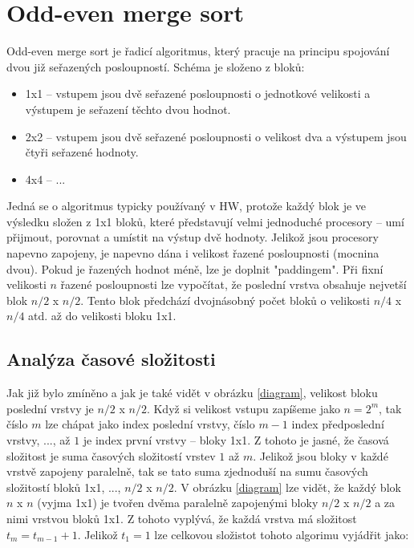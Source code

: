\documentclass[12pt]{article}
\begin{document}
\afterpage{\cfoot{\thepage }}

\section{Odd-even merge sort}
 Odd-even merge sort je řadicí algoritmus, který pracuje na principu spojování dvou již seřazených posloupností. Schéma je složeno z bloků:
 \begin{itemize}
     \item 1x1 -- vstupem jsou dvě seřazené posloupnosti o jednotkové velikosti a výstupem je seřazení těchto dvou hodnot.
     \item 2x2 -- vstupem jsou dvě seřazené posloupnosti o velikost dva a výstupem jsou čtyři seřazené hodnoty.
     \item 4x4 -- ...
 \end{itemize}
 
Jedná se o algoritmus typicky používaný v HW, protože každý blok je ve výsledku složen z 1x1 bloků, které představují velmi jednoduché procesory -- umí přijmout, porovnat a umístit na výstup dvě hodnoty. Jelikož jsou procesory napevno zapojeny, je napevno dána i velikost řazené posloupnosti (mocnina dvou). Pokud je řazených hodnot méně, lze je doplnit "paddingem". Při fixní velikosti \(n\) řazené posloupnosti lze vypočítat, že poslední vrstva obsahuje nejvetší blok \(n/2\) x \(n/2\). Tento blok předchází dvojnásobný počet bloků o velikosti \(n/4\) x \(n/4\) atd. až do velikosti bloku 1x1.

\subsection{Analýza časové složitosti}
Jak již bylo zmíněno a jak je také vidět v obrázku \ref{diagram}, velikost bloku poslední vrstvy je \(n/2\) x \(n/2\). Když si velikost vstupu zapíšeme jako \(n = 2^m\), tak číslo \(m\) lze chápat jako index poslední vrstvy, číslo \(m-1\) index předposlední vrstvy, ..., až \(1\) je index první vrstvy -- bloky 1x1. Z tohoto je jasné, že časová složitost je suma časových složitostí vrstev \(1\) až \(m\). Jelikož jsou bloky v každé vrstvě zapojeny paralelně, tak se tato suma zjednoduší na sumu časových složitostí bloků 1x1, ..., \(n/2\) x \(n/2\). V obrázku \ref{diagram} lze vidět, že každý blok \(n\) x \(n\) (vyjma 1x1) je tvořen dvěma paralelně zapojenými bloky \(n/2\) x \(n/2\) a za nimi vrstvou bloků 1x1. Z tohoto vyplývá, že každá vrstva má složitost \(t_m = t_{m-1} + 1\). Jelikož \(t_1 = 1\) lze celkovou složistot tohoto algorimu vyjádřit jako:
\end{document}
